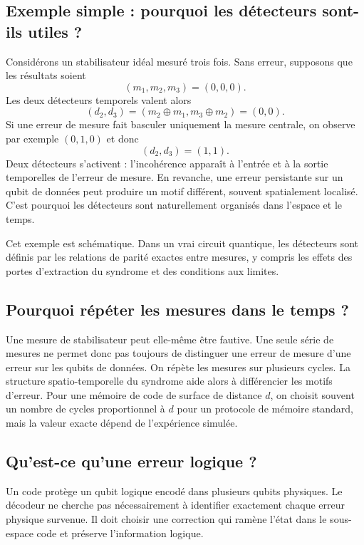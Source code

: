\documentclass[11pt,a4paper]{article}
\newcommand{\xor}{\oplus}
\begin{document}
\subsection{Exemple simple : pourquoi les détecteurs sont-ils utiles ?}

Considérons un stabilisateur idéal mesuré trois fois. Sans erreur, supposons
que les résultats soient
\[
 (m_1,m_2,m_3)=(0,0,0).
\]
Les deux détecteurs temporels valent alors
\[
 (d_2,d_3)=(m_2\xor m_1,m_3\xor m_2)=(0,0).
\]
Si une erreur de mesure fait basculer uniquement la mesure centrale, on
observe par exemple $(0,1,0)$ et donc
\[
 (d_2,d_3)=(1,1).
\]
Deux détecteurs s'activent : l'incohérence apparaît à l'entrée et à la sortie
temporelles de l'erreur de mesure. En revanche, une erreur persistante sur
un qubit de données peut produire un motif différent, souvent spatialement
localisé. C'est pourquoi les détecteurs sont naturellement organisés dans
l'espace et le temps.

Cet exemple est schématique. Dans un vrai circuit quantique, les détecteurs
sont définis par les relations de parité exactes entre mesures, y compris
les effets des portes d'extraction du syndrome et des conditions aux limites.

\subsection{Pourquoi répéter les mesures dans le temps ?}

Une mesure de stabilisateur peut elle-même être fautive. Une seule série de
mesures ne permet donc pas toujours de distinguer une erreur de mesure d'une
erreur sur les qubits de données. On répète les mesures sur plusieurs cycles.
La structure spatio-temporelle du syndrome aide alors à différencier les
motifs d'erreur. Pour une mémoire de code de surface de distance $d$, on
choisit souvent un nombre de cycles proportionnel à $d$ pour un protocole
de mémoire standard, mais la valeur exacte dépend de l'expérience simulée.

\subsection{Qu'est-ce qu'une erreur logique ?}

Un code protège un qubit logique encodé dans plusieurs qubits physiques.
Le décodeur ne cherche pas nécessairement à identifier exactement chaque
erreur physique survenue. Il doit choisir une correction qui ramène l'état
dans le sous-espace code et préserve l'information logique.
\end{document}
